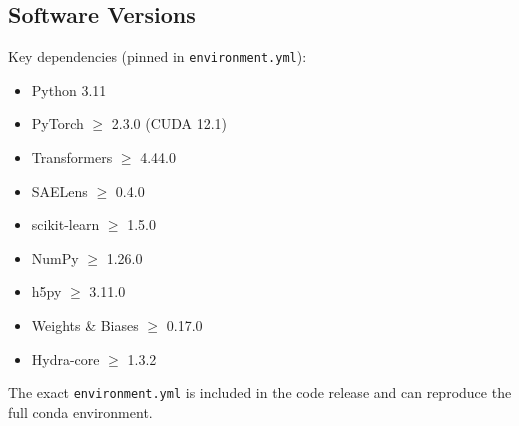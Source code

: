 \subsection{Software Versions}

Key dependencies (pinned in \texttt{environment.yml}):
\begin{itemize}[leftmargin=*,itemsep=1pt]
  \item Python 3.11
  \item PyTorch $\geq$ 2.3.0 (CUDA 12.1)
  \item Transformers $\geq$ 4.44.0
  \item SAELens $\geq$ 0.4.0
  \item scikit-learn $\geq$ 1.5.0
  \item NumPy $\geq$ 1.26.0
  \item h5py $\geq$ 3.11.0
  \item Weights \& Biases $\geq$ 0.17.0
  \item Hydra-core $\geq$ 1.3.2
\end{itemize}
The exact \texttt{environment.yml} is included in the code release and can
reproduce the full conda environment.
